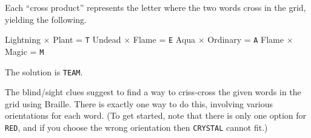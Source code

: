 Each ``cross product'' represents the letter where the two words cross in
the grid, yielding the following.

\begin{center}
Lightning \(\times\) Plant = \texttt{T}\hfill
Undead \(\times\) Flame = \texttt{E}\hfill
Aqua \(\times\) Ordinary = \texttt{A}\hfill
Flame \(\times\) Magic = \texttt{M}
\end{center}

The solution is \texttt{TEAM}.


The blind/sight clues suggest to find a way to criss-cross the given
words in the grid using Braille. There is exactly one way to do this,
involving various orientations for each word. (To get started, note that
there is only one option for \texttt{RED}, and if you choose the wrong
orientation then \texttt{CRYSTAL} cannot fit.)

